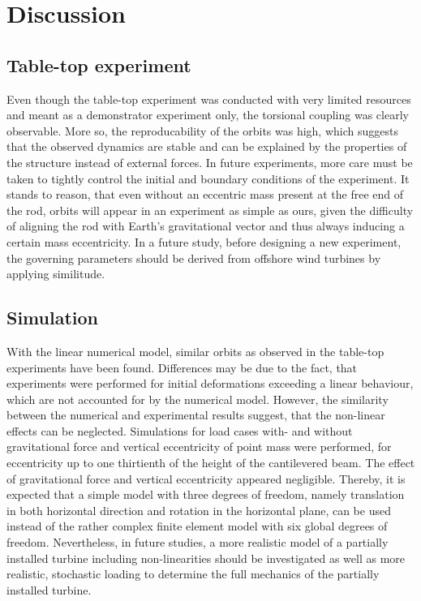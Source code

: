 \documentclass{article}
\begin{document}
\section{Discussion}
\label{sec:discussion}

\subsection{Table-top experiment}

Even though the table-top experiment was conducted with very limited resources and meant as a demonstrator experiment only, the torsional coupling was clearly observable. More so, the reproducability of the orbits was high, which suggests that the observed dynamics are stable and can be explained by the properties of the structure instead of external forces. In future experiments, more care must be taken to tightly control the initial and boundary conditions of the experiment. It stands to reason, that even without an eccentric mass present at the free end of the rod, orbits will appear in an experiment as simple as ours, given the difficulty of aligning the rod with Earth's gravitational vector and thus always inducing a certain mass eccentricity. In a future study, before designing a new experiment, the governing parameters should be derived from offshore wind turbines by applying similitude. 

\subsection{Simulation}

With the linear numerical model, similar orbits as observed in the table-top experiments have been found. Differences may be due to the fact, that experiments were performed for initial deformations exceeding a linear behaviour, which are not accounted for by the numerical model. However, the similarity between the numerical and experimental results suggest, that the non-linear effects can be neglected. Simulations for load cases with- and without gravitational force and vertical eccentricity of point mass were performed, for eccentricity up to one thirtienth of the height of the cantilevered beam. The effect of  gravitational force and vertical eccentricity appeared negligible. Thereby, it is expected that a simple model with three degrees of freedom, namely translation in both horizontal direction and rotation in the horizontal plane, can be used instead of the rather complex finite element model with six global degrees of freedom. Nevertheless, in future studies, a more realistic model of a partially installed turbine including non-linearities should be investigated as well as more realistic, stochastic loading to determine the full mechanics of the partially installed turbine.
\end{document}
